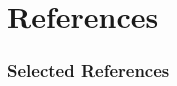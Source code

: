 \documentclass{beamer}
\begin{document}
\section{References}
\begin{frame}
\frametitle{Selected References}
\scriptsize


\end{frame}
\end{document}
